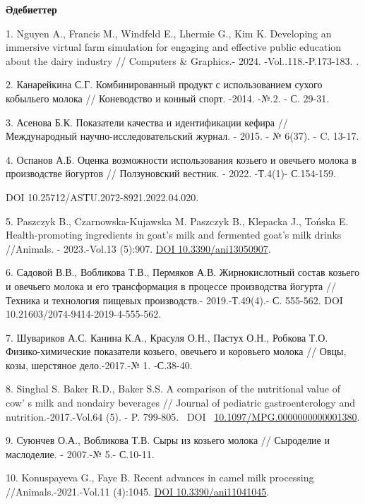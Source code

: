 \begin{center}
{\bfseries Әдебиеттер}
\end{center}

\begin{refs}
1. Nguyen A., Francis M., Windfeld E., Lhermie G., Kim K. Developing an
immersive virtual farm simulation for engaging and effective public
education about the dairy industry // Computers \& Graphics.-
2024. -Vol..118.-P.173-183. .

2. Канарейкина С.Г. Комбинированный продукт с использованием сухого
кобыльего молока // Коневодство и конный спорт. -2014. -№.2. - С.
29-31.

3. Асенова Б.К. Показатели качества и идентификации кефира //
Международный научно-исследовательский журнал. - 2015. - № 6(37). - C.
13-17.

4. Оспанов А.Б. Оценка возможности использования козьего и овечьего
молока в производстве йогуртов // Ползуновский вестник. - 2022. -Т.4(1)-
С.154-159.

DOI 10.25712/ASTU.2072-8921.2022.04.020.

5. Paszczyk B., Czarnowska-Kujawska M. Paszczyk B., Klepacka J., Tońska
E. Health-promoting ingredients in goat's milk and fermented goat's milk
drinks //Animals. - 2023.-Vol.13 (5):907.
\href{https://doi.org/10.3390/ani13050907}{DOI 10.3390/ani13050907}.

6. Садовой В.В., Вобликова Т.В., Пермяков А.В. Жирнокислотный состав
козьего и овечьего молока и его трансформация в процессе производства
йогурта // Техника и технология пищевых производств.- 2019.-Т.49(4).- С.
555-562. DOI 10.21603/2074-9414-2019-4-555-562.

7. Шувариков А.С. Канина К.А., Красуля О.Н., Пастух О.Н., Робкова Т.О.
Физико-химические показатели козьего, овечьего и коровьего молока //
Овцы, козы, шерстяное дело.-2017.-№ 1. -С.38-40.

8. Singhal S. Baker R.D., Baker S.S. A comparison of the nutritional
value of cow' s milk and nondairy beverages // Journal of
pediatric gastroenterology and nutrition.-2017.-Vol.64 (5). - P.
799-805. ~DOI
~\href{https://doi.org/10.1097/mpg.0000000000001380}{10.1097/MPG.0000000000001380}.

9. Суюнчев О.А., Вобликова Т.В. Сыры из козьего молока // Сыроделие и
маслоделие. - 2007.-№ 5.- С.10-11.

10. Konuspayeva G., Faye B. Recent advances in camel milk processing
//Animals.-2021.-Vol.11 (4):1045.
\href{https://doi.org/10.3390/ani11041045}{DOI 10.3390/ani11041045}.


\end{refs}
